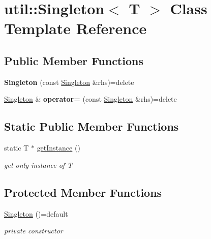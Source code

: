\hypertarget{classutil_1_1_singleton}{}\section{util\+:\+:Singleton$<$ T $>$ Class Template Reference}
\label{classutil_1_1_singleton}
\subsection*{Public Member Functions}
\begin{DoxyCompactItemize}
\item 
\mbox{\label{classutil_1_1_singleton_a51dcc65264b8c397b8686cc019ca6201}} 
{\bfseries Singleton} (const \mbox{\hyperlink{classutil_1_1_singleton}{Singleton}} \&rhs)=delete
\item 
\mbox{\label{classutil_1_1_singleton_a455185b795ff1eba785a6ae8b45937b4}} 
\mbox{\hyperlink{classutil_1_1_singleton}{Singleton}} \& {\bfseries operator=} (const \mbox{\hyperlink{classutil_1_1_singleton}{Singleton}} \&rhs)=delete
\end{DoxyCompactItemize}
\subsection*{Static Public Member Functions}
\begin{DoxyCompactItemize}
\item 
static T $\ast$ \mbox{\hyperlink{classutil_1_1_singleton_a04d271729ac3abd4bc4cc359917af798}{get\+Instance}} ()
\begin{DoxyCompactList}\small\item\em get only instance of T \end{DoxyCompactList}\end{DoxyCompactItemize}
\subsection*{Protected Member Functions}
\begin{DoxyCompactItemize}
\item 
\mbox{\label{classutil_1_1_singleton_afab85c05ff6367c18700af40b62a4927}} 
\mbox{\hyperlink{classutil_1_1_singleton_afab85c05ff6367c18700af40b62a4927}{Singleton}} ()=default
\begin{DoxyCompactList}\small\item\em private constructor \end{DoxyCompactList}\end{DoxyCompactItemize}


